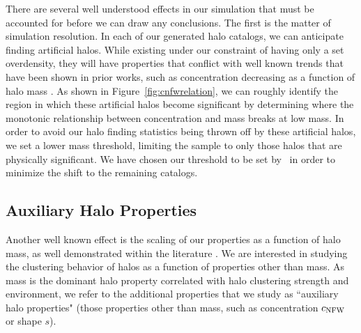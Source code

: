 \documentclass[usenatbib,usegraphicx,letterpaper]{mn2e}
\begin{document}
There are several well understood effects in our simulation that must be accounted for before we can draw any conclusions. The first is the matter of simulation resolution. In each of our generated halo catalogs, we can anticipate finding artificial halos. While existing under our constraint of having only a set overdensity, they will have properties that conflict with well known trends that have been shown in prior works, such as concentration decreasing as a function of halo mass \citep{wechsler06}. As shown in Figure~\ref{fig:cnfwrelation}, we can roughly identify the region in which these artificial halos become significant by determining where the monotonic relationship between concentration and mass breaks at low mass. In order to avoid our halo finding statistics being thrown off by these artificial halos, we set a lower mass threshold, limiting the sample to only those halos that are physically significant. We have chosen our threshold to be set by \simB \ in order to minimize the shift to the remaining catalogs.

\subsection{Auxiliary Halo Properties}

Another well known effect is the scaling of our properties as a function of halo mass, as well demonstrated within the literature \citep{duffy08}. We are interested in studying the clustering behavior of halos as a function of properties other than mass. As mass is the dominant halo property correlated with halo clustering strength and environment, we refer to the additional properties that we study as 
``auxiliary halo properties" (those properties other than mass, such as concentration $c_{\rm NFW}$ or shape $s$). 
\end{document}
